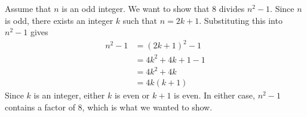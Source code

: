 \documentclass[11pt,letterpaper]{article}
\begin{document}
Assume that $n$ is an odd integer. We want to show that $8$ divides $n^2 - 1$. Since $n$ is odd, there exists an integer $k$ such that $n = 2k+1$. Substituting this into $n^2 -1$ gives
\begin{align*}
	n^2 - 1 &= (2k+1)^2 - 1 \\
	&= 4k^2 + 4k + 1 - 1 \\
	&= 4k^2 + 4k \\
	&= 4k(k+1)
\end{align*}
Since $k$ is an integer, either $k$ is even or $k+1$ is even. In either case, $n^2 - 1$ contains a factor of 8, which is what we wanted to show. 

	

\end{document}
